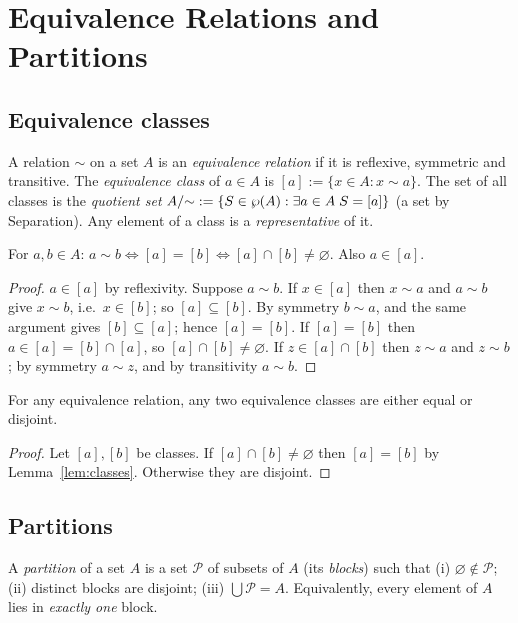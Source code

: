 \chapter{Equivalence Relations and Partitions}\label{ch:equiv}

\section{Equivalence classes}

\begin{definition}
	A relation $\sim$ on a set $A$ is an \emph{equivalence relation} if it is reflexive, symmetric and transitive. The \emph{equivalence class} of $a\in A$ is $[a]:=\{x\in A:x\sim a\}$. The set of all classes is the \emph{quotient set} $A/{\sim}:=\{S\in\wp(A):\exists a\in A\;S=[a]\}$ (a set by Separation). Any element of a class is a \emph{representative} of it.
\end{definition}

\begin{lemma}\label{lem:classes}
	For $a,b\in A$: $a\sim b\iff[a]=[b]\iff[a]\cap[b]\ne\varnothing$. Also $a\in[a]$.
\end{lemma}
\begin{proof}
	$a\in[a]$ by reflexivity. Suppose $a\sim b$. If $x\in[a]$ then $x\sim a$ and $a\sim b$ give $x\sim b$, i.e.\ $x\in[b]$; so $[a]\subseteq[b]$. By symmetry $b\sim a$, and the same argument gives $[b]\subseteq[a]$; hence $[a]=[b]$. If $[a]=[b]$ then $a\in[a]=[b]\cap[a]$, so $[a]\cap[b]\neq\varnothing$. If $z\in[a]\cap[b]$ then $z\sim a$ and $z\sim b$; by symmetry $a\sim z$, and by transitivity $a\sim b$.
\end{proof}

\begin{theorem}\label{thm:eqdisjoint}
	For any equivalence relation, any two equivalence classes are either equal or disjoint.
\end{theorem}
\begin{proof}
	Let $[a],[b]$ be classes. If $[a]\cap[b]\neq\varnothing$ then $[a]=[b]$ by Lemma~\ref{lem:classes}. Otherwise they are disjoint.
\end{proof}

\section{Partitions}

\begin{definition}[Partition]
	A \emph{partition} of a set $A$ is a set $\mathcal P$ of subsets of $A$ (its \emph{blocks}) such that (i) $\varnothing\notin\mathcal P$; (ii) distinct blocks are disjoint; (iii) $\bigcup\mathcal P=A$. Equivalently, every element of $A$ lies in \emph{exactly one} block.
\end{definition}


